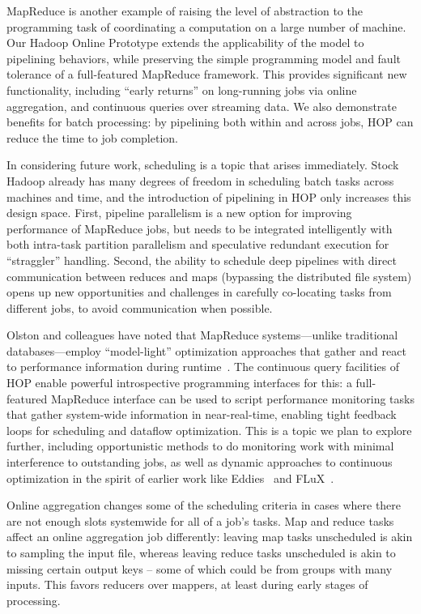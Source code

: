 MapReduce is another example of raising the level of abstraction to the programming
task of coordinating a computation on a large number of machine. 
Our Hadoop Online Prototype extends the applicability of the model to pipelining 
behaviors, while preserving the simple programming model and fault tolerance of a 
full-featured MapReduce framework.  This provides significant new functionality, 
including ``early returns'' on long-running jobs via online aggregation, and continuous 
queries over streaming data.  We also demonstrate benefits for batch processing:  by 
pipelining both within and across jobs, HOP can reduce the time to job completion. 

In considering future work, scheduling is a topic that arises immediately. Stock Hadoop 
already has many degrees of freedom in scheduling batch tasks across machines and time, 
and the introduction of pipelining in HOP only increases this design space.  First, pipeline 
parallelism is a new option for improving performance of MapReduce jobs, but needs to be 
integrated intelligently with both intra-task partition parallelism and speculative redundant 
execution for ``straggler'' handling. Second, the ability to schedule deep pipelines with direct
communication between reduces and maps (bypassing the distributed file system) opens up new 
opportunities and challenges in carefully co-locating tasks from different jobs, to avoid 
communication when possible.  

Olston and colleagues have noted that MapReduce systems---unlike traditional
databases---employ ``model-light'' optimization approaches that gather and
react to performance information during runtime~\cite{olston-usenix08}.  The
continuous query facilities of HOP enable powerful introspective programming
interfaces for this: a full-featured MapReduce interface can be used to script
performance monitoring tasks that gather system-wide information in
near-real-time, enabling tight feedback loops for scheduling and dataflow
optimization.  This is a topic we plan to explore further, including
opportunistic methods to do monitoring work with minimal interference to
outstanding jobs, as well as dynamic approaches to continuous optimization in
the spirit of earlier work like Eddies~\cite{eddies} and FLuX~\cite{flux-lb}.

Online aggregation changes some of the scheduling criteria in cases where there are not enough 
slots systemwide for all of a job's tasks.  Map and reduce tasks affect an online aggregation 
job differently: leaving map tasks unscheduled is akin to sampling the input file, whereas leaving 
reduce tasks unscheduled is akin to missing certain output keys -- some of which could be from 
groups with many inputs.  This favors reducers over mappers, at least during early stages of processing.  

